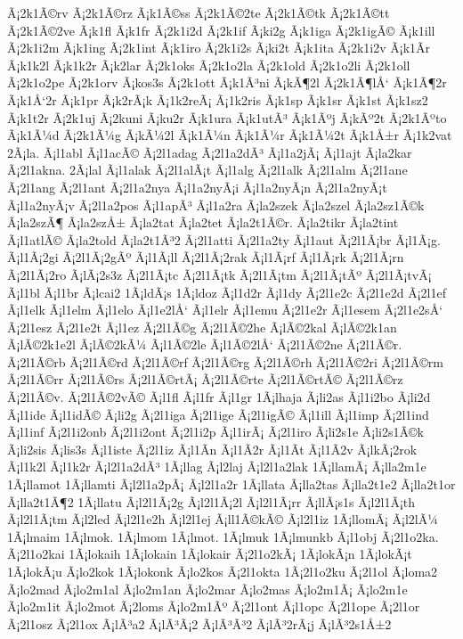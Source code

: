 {Ã¡2k1Ã©rv
Ã¡2k1Ã©rz
Ã¡k1Ã©ss
Ã¡2k1Ã©2te
Ã¡2k1Ã©tk
Ã¡2k1Ã©tt
Ã¡2k1Ã©2ve
Ã¡k1fl
Ã¡k1fr
Ã¡2k1i2d
Ã¡2k1if
Ã¡ki2g
Ã¡k1iga
Ã¡2k1igÃ©
Ã¡k1ill
Ã¡2k1i2m
Ã¡k1ing
Ã¡2k1int
Ã¡k1iro
Ã¡2k1i2s
Ã¡ki2t
Ã¡k1ita
Ã¡2k1i2v
Ã¡k1Ã­r
Ã¡k1k2l
Ã¡k1k2r
Ã¡k2lar
Ã¡2k1oks
Ã¡2k1o2la
Ã¡2k1old
Ã¡2k1o2li
Ã¡2k1oll
Ã¡2k1o2pe
Ã¡2k1orv
Ã¡kos3s
Ã¡2k1ott
Ã¡k1Ã³ni
Ã¡kÃ¶2l
Ã¡2k1Ã¶lÅ‘
Ã¡k1Ã¶2r
Ã¡k1Å‘2r
Ã¡k1pr
Ã¡k2rÃ¡k
Ã¡1k2reÃ¡
Ã¡1k2ris
Ã¡k1sp
Ã¡k1sr
Ã¡k1st
Ã¡k1sz2
Ã¡k1t2r
Ã¡2k1uj
Ã¡2kuni
Ã¡ku2r
Ã¡k1ura
Ã¡k1utÃ³
Ã¡k1Ãºj
Ã¡kÃº2t
Ã¡2k1Ãºto
Ã¡k1Ã¼d
Ã¡2k1Ã¼g
Ã¡kÃ¼2l
Ã¡k1Ã¼n
Ã¡k1Ã¼r
Ã¡k1Ã¼2t
Ã¡k1Å±r
Ã¡1k2vat
2Ã¡la.
Ã¡l1abl
Ã¡l1acÃ©
Ã¡2l1adag
Ã¡2l1a2dÃ³
Ã¡l1a2jÃ¡
Ã¡l1ajt
Ã¡la2kar
Ã¡2l1akna.
2Ã¡lal
Ã¡l1alak
Ã¡2l1alÃ¡t
Ã¡l1alg
Ã¡2l1alk
Ã¡2l1alm
Ã¡2l1ane
Ã¡2l1ang
Ã¡2l1ant
Ã¡2l1a2nya
Ã¡l1a2nyÃ¡i
Ã¡l1a2nyÃ¡n
Ã¡2l1a2nyÃ¡t
Ã¡l1a2nyÃ¡v
Ã¡2l1a2pos
Ã¡l1apÃ³
Ã¡l1a2ra
Ã¡la2szek
Ã¡la2szel
Ã¡la2sz1Ã©k
Ã¡la2szÃ¶
Ã¡la2szÅ±
Ã¡la2tat
Ã¡la2tet
Ã¡la2t1Ã©r.
Ã¡la2tikr
Ã¡la2tint
Ã¡l1atlÃ©
Ã¡la2told
Ã¡la2t1Ã³2
Ã¡2l1atti
Ã¡2l1a2ty
Ã¡l1aut
Ã¡2l1Ã¡br
Ã¡l1Ã¡g.
Ã¡l1Ã¡2gi
Ã¡2l1Ã¡2gÃº
Ã¡l1Ã¡ll
Ã¡2l1Ã¡2rak
Ã¡l1Ã¡rf
Ã¡l1Ã¡rk
Ã¡2l1Ã¡rn
Ã¡2l1Ã¡2ro
Ã¡lÃ¡2s3z
Ã¡2l1Ã¡tc
Ã¡2l1Ã¡tk
Ã¡2l1Ã¡tm
Ã¡2l1Ã¡tÃº
Ã¡2l1Ã¡tvÃ¡
Ã¡l1bl
Ã¡l1br
Ã¡lcai2
1Ã¡ldÃ¡s
1Ã¡ldoz
Ã¡l1d2r
Ã¡l1dy
Ã¡2l1e2c
Ã¡2l1e2d
Ã¡2l1ef
Ã¡l1elk
Ã¡l1elm
Ã¡l1elo
Ã¡l1e2lÅ‘
Ã¡l1elr
Ã¡l1emu
Ã¡2l1e2r
Ã¡l1esem
Ã¡2l1e2sÅ‘
Ã¡2l1esz
Ã¡2l1e2t
Ã¡l1ez
Ã¡2l1Ã©g
Ã¡2l1Ã©2he
Ã¡lÃ©2kal
Ã¡lÃ©2k1an
Ã¡lÃ©2k1e2l
Ã¡lÃ©2kÃ¼
Ã¡l1Ã©2le
Ã¡l1Ã©2lÅ‘
Ã¡2l1Ã©2ne
Ã¡2l1Ã©r.
Ã¡2l1Ã©rb
Ã¡2l1Ã©rd
Ã¡2l1Ã©rf
Ã¡2l1Ã©rg
Ã¡2l1Ã©rh
Ã¡2l1Ã©2ri
Ã¡2l1Ã©rm
Ã¡2l1Ã©rr
Ã¡2l1Ã©rs
Ã¡2l1Ã©rtÃ¡
Ã¡2l1Ã©rte
Ã¡2l1Ã©rtÃ©
Ã¡2l1Ã©rz
Ã¡2l1Ã©v.
Ã¡2l1Ã©2vÃ©
Ã¡l1fl
Ã¡l1fr
Ã¡l1gr
1Ã¡lhaja
Ã¡li2as
Ã¡l1i2bo
Ã¡li2d
Ã¡l1ide
Ã¡l1idÃ©
Ã¡li2g
Ã¡2l1iga
Ã¡2l1ige
Ã¡2l1igÃ©
Ã¡l1ill
Ã¡l1imp
Ã¡2l1ind
Ã¡l1inf
Ã¡2l1i2onb
Ã¡2l1i2ont
Ã¡2l1i2p
Ã¡l1irÃ¡
Ã¡2l1iro
Ã¡li2s1e
Ã¡li2s1Ã©k
Ã¡li2sis
Ã¡lis3s
Ã¡l1iste
Ã¡2l1iz
Ã¡l1Ã­n
Ã¡l1Ã­2r
Ã¡l1Ã­t
Ã¡l1Ã­2v
Ã¡lkÃ¡2rok
Ã¡l1k2l
Ã¡l1k2r
Ã¡l2l1a2dÃ³
1Ã¡llag
Ã¡l2laj
Ã¡l2l1a2lak
1Ã¡llamÃ¡
Ã¡lla2m1e
1Ã¡llamot
1Ã¡llamti
Ã¡l2l1a2pÃ¡
Ã¡l2l1a2r
1Ã¡llata
Ã¡lla2tas
Ã¡lla2t1e2
Ã¡lla2t1or
Ã¡lla2t1Ã¶2
1Ã¡llatu
Ã¡l2l1Ã¡2g
Ã¡l2l1Ã¡2l
Ã¡l2l1Ã¡rr
Ã¡llÃ¡s1s
Ã¡l2l1Ã¡th
Ã¡l2l1Ã¡tm
Ã¡l2led
Ã¡l2l1e2h
Ã¡l2l1ej
Ã¡ll1Ã©kÃ©
Ã¡l2l1iz
1Ã¡llomÃ¡
Ã¡l2lÃ¼
1Ã¡lmaim
1Ã¡lmok.
1Ã¡lmom
1Ã¡lmot.
1Ã¡lmuk
1Ã¡lmunkb
Ã¡l1obj
Ã¡2l1o2ka.
Ã¡2l1o2kai
1Ã¡lokaih
1Ã¡lokain
1Ã¡lokair
Ã¡2l1o2kÃ¡
1Ã¡lokÃ¡n
1Ã¡lokÃ¡t
1Ã¡lokÃ¡u
Ã¡lo2kok
1Ã¡lokonk
Ã¡lo2kos
Ã¡2l1okta
1Ã¡2l1o2ku
Ã¡2l1ol
Ã¡loma2
Ã¡lo2mad
Ã¡lo2m1al
Ã¡lo2m1an
Ã¡lo2mar
Ã¡lo2mas
Ã¡lo2m1Ã¡
Ã¡lo2m1e
Ã¡lo2m1it
Ã¡lo2mot
Ã¡2loms
Ã¡lo2m1Ãº
Ã¡2l1ont
Ã¡l1opc
Ã¡2l1ope
Ã¡2l1or
Ã¡2l1osz
Ã¡2l1ox
Ã¡lÃ³a2
Ã¡lÃ³Ã¡2
Ã¡lÃ³Ã³2
Ã¡lÃ³2rÃ¡j
Ã¡lÃ³2s1Å±2
}
